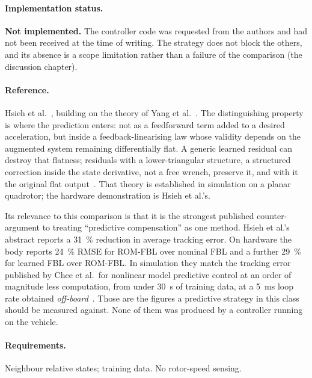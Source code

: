 \paragraph{Implementation status.} \textbf{Not implemented.} The controller code was requested from the
authors and had not been received at the time of writing. The strategy does not block the others,
and its absence is a scope limitation rather than a failure of the comparison
(the discussion chapter).

\paragraph{Reference.} Hsieh et al.~\cite{hsieh2026flatness}, building on the theory of Yang et
al.~\cite{yang2025flatnessresiduals}. The distinguishing property is where the prediction enters:
not as a feedforward term added to a desired acceleration, but inside a feedback-linearising law
whose validity depends on the augmented system remaining differentially flat. A generic learned
residual can destroy that flatness; residuals with a lower-triangular structure, a structured
correction inside the state derivative, not a free wrench, preserve it, and with it the original
flat output~\cite{yang2025flatnessresiduals}. That theory is established in simulation on a planar
quadrotor; the hardware demonstration is Hsieh et al.'s.

Its relevance to this comparison is that it is the strongest published counter-argument to treating
``predictive compensation'' as one method. Hsieh et al.'s abstract reports a \SI{31}{\percent}
reduction in average tracking error. On hardware the body reports \SI{24}{\percent} RMSE for
ROM-FBL over nominal FBL and a further \SI{29}{\percent} for learned FBL over ROM-FBL.
In simulation they match the tracking error published by Chee et al.\ for nonlinear model
predictive control at an order of magnitude less computation, from under \SI{30}{\second} of
training data, at a \SI{5}{\milli\second} loop rate obtained \emph{off-board}~\cite{hsieh2026flatness}.
Those are the figures a predictive strategy in this class should be measured against. None of them
was produced by a controller running on the vehicle.

\paragraph{Requirements.} Neighbour relative states; training data. No rotor-speed sensing.

